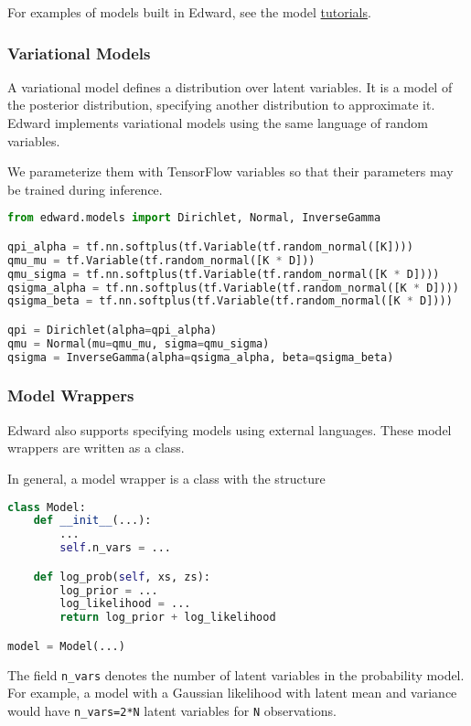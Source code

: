 For examples of models built in Edward, see the model
\href{/tutorials/}{tutorials}.

\subsubsection{Variational Models}

A variational model defines a distribution over latent variables. It
is a model of the posterior distribution, specifying another
distribution to approximate it.
Edward implements variational models using the same language of random
variables.

We parameterize them with TensorFlow variables so that their
parameters may be trained during inference.

\begin{lstlisting}[language=Python]
from edward.models import Dirichlet, Normal, InverseGamma

qpi_alpha = tf.nn.softplus(tf.Variable(tf.random_normal([K])))
qmu_mu = tf.Variable(tf.random_normal([K * D]))
qmu_sigma = tf.nn.softplus(tf.Variable(tf.random_normal([K * D])))
qsigma_alpha = tf.nn.softplus(tf.Variable(tf.random_normal([K * D])))
qsigma_beta = tf.nn.softplus(tf.Variable(tf.random_normal([K * D])))

qpi = Dirichlet(alpha=qpi_alpha)
qmu = Normal(mu=qmu_mu, sigma=qmu_sigma)
qsigma = InverseGamma(alpha=qsigma_alpha, beta=qsigma_beta)
\end{lstlisting}


\subsubsection{Model Wrappers}

Edward also supports specifying models using external languages. These
model wrappers are written as a class.

In general, a model wrapper is a class with the structure

\begin{lstlisting}[language=Python]
class Model:
    def __init__(...):
        ...
        self.n_vars = ...

    def log_prob(self, xs, zs):
        log_prior = ...
        log_likelihood = ...
        return log_prior + log_likelihood

model = Model(...)
\end{lstlisting}

The field \texttt{n_vars} denotes the number of latent variables in the
probability model. For example, a model with a Gaussian likelihood with latent
mean and variance would have \texttt{n_vars=2*N} latent variables for
\texttt{N} observations.

